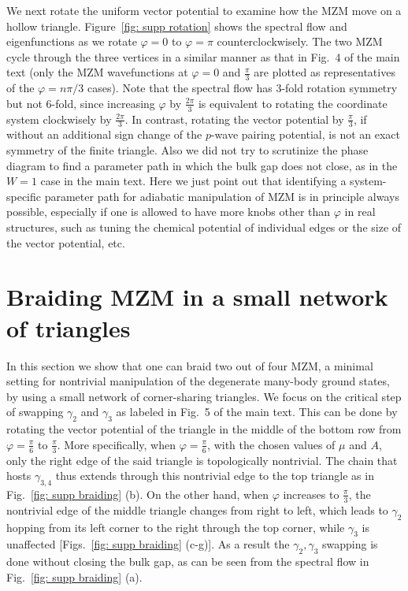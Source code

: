 \documentclass[aps,prb,showpacs,amsmath,amssymb,superscriptaddress]{revtex4-2}
\begin{document}
We next rotate the uniform vector potential to examine how the MZM move on a hollow triangle. Figure~\ref{fig: supp rotation} shows the spectral flow and eigenfunctions as we rotate $\varphi=0$ to $\varphi=\pi$ counterclockwisely. The two MZM cycle through the three vertices in a similar manner as that in Fig.~4 of the main text (only the MZM wavefunctions at $\varphi = 0$ and $\frac{\pi}{3}$ are plotted as representatives of the $\varphi = n\pi/3$ cases). Note that the spectral flow has 3-fold rotation symmetry but not 6-fold, since increasing $\varphi$ by $\frac{2\pi}{3}$ is equivalent to rotating the coordinate system clockwisely by $\frac{2\pi}{3}$. In contrast, rotating the vector potential by $\frac{\pi}{3}$, if without an additional sign change of the $p$-wave pairing potential, is not an exact symmetry of the finite triangle. Also we did not try to scrutinize the phase diagram to find a parameter path in which the bulk gap does not close, as in the $W=1$ case in the main text. Here we just point out that identifying a system-specific parameter path for adiabatic manipulation of MZM is in principle always possible, especially if one is allowed to have more knobs other than $\varphi$ in real structures, such as tuning the chemical potential of individual edges or the size of the vector potential, etc.

\section{Braiding MZM in a small network of triangles}

In this section we show that one can braid two out of four MZM, a minimal setting for nontrivial manipulation of the degenerate many-body ground states, by using a small network of corner-sharing triangles. We focus on the critical step of swapping $\gamma_2$ and $\gamma_3$ as labeled in Fig.~5 of the main text. This can be done by rotating the vector potential of the triangle in the middle of the bottom row from $\varphi = \frac{\pi}{6}$ to $\frac{\pi}{3}$. More specifically, when $\varphi = \frac{\pi}{6}$, with the chosen values of $\mu$ and $A$, only the right edge of the said triangle is topologically nontrivial. The chain that hosts $\gamma_{3,4}$ thus extends through this nontrivial edge to the top triangle as in Fig.~\ref{fig: supp braiding} (b). On the other hand, when $\varphi$ increases to $\frac{\pi}{3}$, the nontrivial edge of the middle triangle changes from right to left, which leads to $\gamma_2$ hopping from its left corner to the right through the top corner, while $\gamma_3$ is unaffected [Figs.~\ref{fig: supp braiding} (c-g)]. As a result the $\gamma_2,\gamma_3$ swapping is done without closing the bulk gap, as can be seen from the spectral flow in Fig.~\ref{fig: supp braiding} (a).
\end{document}
